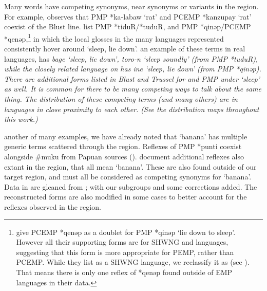 
Many words have competing synonyms,
near synonyms or variants in the region.
For example, \citet[249]{Blust1993} observes that PMP *ka-labaw ‘rat’
and PCEMP *kanzupay ‘rat’ coexist  of the Blust line.
\citet{BlustTrussel2020} list PMP *tiduR/*tuduR,
and PMP *qinəp/PCEMP *qenəp,\footnote{
		\citet{BlustTrussel2020}
		give PCEMP *qenəp as a doublet for PMP *qinəp ‘lie down to sleep’.
		However all their supporting forms are for SHWNG
		and  languages, suggesting that this form is more appropriate
		for PEMP, rather than PCEMP.
		While they list  as a SHWNG language,
		we reclassify it as  (see ).
		That means there is only one reflex of *qenəp found outside of
		EMP languages in their data.}
in which the local glosses in
the many languages represented consistently hover around ‘sleep, lie down’.
 an example of these terms in real languages,
 has \it{bage} ‘sleep,
lie down’, \it{toro-n} ‘sleep soundly’ (from PMP *tuduR),
while the closely related  language on  has \it{ine}
‘sleep, lie down’ (from PMP *qinəp).
There are additional forms listed in Blust
and Trussel for 
and PMP under ‘sleep’ as well.
It is common for there to be many competing ways to talk about the same thing.
The distribution of these competing terms (and many others) are
in languages in close proximity to each other.
(See the distribution maps throughout this work.)

 another of many examples,
we have already noted that ‘banana’ has multiple generic terms
scattered through the region.
Reflexes of PMP *punti coexist alongside {\#}muku from Papuan
sources ().
\citet{DonohueDenham2009} document additional reflexes also extant
in the region, that all mean ‘banana’.
These are also found outside of our target region,
and must all be considered as competing synonyms for ‘banana’.
Data in  are gleaned from \citet{DonohueDenham2009}; with our subgroups
and some corrections added.
The reconstructed forms are also modified in some cases
to better account for the reflexes observed in the region.

